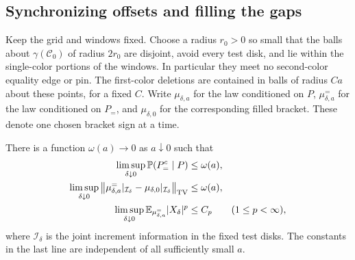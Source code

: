 \subsection{Synchronizing offsets and filling the gaps}

Keep the grid and windows fixed.  Choose a radius $r_0>0$ so small
that the balls about $\gamma(\mathcal C_0)$ of radius $2r_0$ are
disjoint, avoid every test disk, and lie within the single-color portions
of the windows.  In particular they meet no second-color equality
edge or pin.  The first-color deletions are contained in balls of
radius $Ca$ about these points, for a fixed $C$.  Write
$\mu_{\delta,a}$ for the law conditioned on $P$,
$\mu_{\delta,a}^{=}$ for the law conditioned on $P_=$, and
$\mu_{\delta,0}$ for the corresponding filled bracket.  These denote
one chosen bracket sign at a time.

\begin{lemma}\label{pins:gap-closing}
There is a function $\omega(a)\to0$ as $a\downarrow0$ such that
\begin{align}
 \limsup_{\delta\downarrow0}
       \mathbb P(P_=^c\mid P)&\le\omega(a),
       \label{pins:offset-synchronization}\\
 \limsup_{\delta\downarrow0}
 \left\|\mu_{\delta,a}^{=}|_{\mathcal I_\delta}
              -\mu_{\delta,0}|_{\mathcal I_\delta}\right\|_{\mathrm{TV}}
       &\le\omega(a),\label{pins:increment-tv}\\
 \limsup_{\delta\downarrow0}
       \mathbb E_{\mu_{\delta,a}^{=}}|X_\delta|^p
       &\le C_p\qquad(1\le p<\infty),
       \label{pins:uniform-common-moments}
\end{align}
where $\mathcal I_\delta$ is the joint increment information in the
fixed test disks.  The constants in the last line are independent of
all sufficiently small $a$.
\end{lemma}

